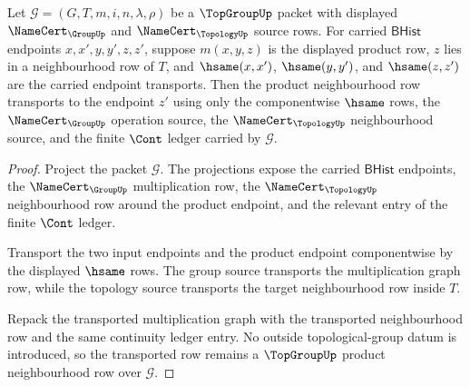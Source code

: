 \begin{theorem}
\label{thm:topgroup-product-neighbourhood-transport}
Let $\mathcal G=(G,T,m,i,n,\lambda,\rho)$ be a $\TopGroupUp$ packet with
displayed $\NameCert_{\GroupUp}$ and $\NameCert_{\TopologyUp}$ source rows.
For carried $\mathsf{BHist}$ endpoints $x,x',y,y',z,z'$, suppose
$m(x,y,z)$ is the displayed product row, $z$ lies in a neighbourhood row of
$T$, and $\hsame(x,x')$, $\hsame(y,y')$, and $\hsame(z,z')$ are the carried
endpoint transports. Then the product neighbourhood row transports to the
endpoint $z'$ using only the componentwise $\hsame$ rows, the
$\NameCert_{\GroupUp}$ operation source, the $\NameCert_{\TopologyUp}$
neighbourhood source, and the finite $\Cont$ ledger carried by
$\mathcal G$.
\end{theorem}
\begin{proof}
Project the packet $\mathcal G$. The projections expose the carried
$\mathsf{BHist}$ endpoints, the $\NameCert_{\GroupUp}$ multiplication row,
the $\NameCert_{\TopologyUp}$ neighbourhood row around the product endpoint,
and the relevant entry of the finite $\Cont$ ledger.

Transport the two input endpoints and the product endpoint componentwise by
the displayed $\hsame$ rows. The group source transports the multiplication
graph row, while the topology source transports the target neighbourhood row
inside $T$.

Repack the transported multiplication graph with the transported
neighbourhood row and the same continuity ledger entry. No outside
topological-group datum is introduced, so the transported row remains a
$\TopGroupUp$ product neighbourhood row over $\mathcal G$.
\end{proof}

